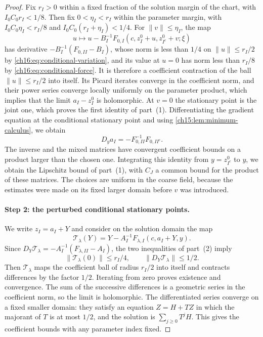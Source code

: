 \begin{proof}
Fix $r_I>0$ within a fixed fraction of the solution margin of the chart, with $I_0C_0r_I<1/8$. Then fix $0<\eta_I<r_I$ within the parameter margin, with $I_0C_0\eta_I<r_I/8$ and $I_0C_0(r_I+\eta_I)<1/4$. For $\|v\|\le\eta_I$, the map
\[
 u\longmapsto u-B_I^{-1}F_{0,I}(c,z_I^0+u,z_{I^c}^0+v;\xi)
\]
has derivative $-B_I^{-1}(F_{0,II}-B_I)$, whose norm is less than $1/4$ on $\|u\|\le r_I/2$ by \eqref{ch16:eq:conditional-variation}, and its value at $u=0$ has norm less than $r_I/8$ by \eqref{ch16:eq:conditional-force}. It is therefore a coefficient contraction of the ball $\|u\|\le r_I/2$ into itself. Its Picard iterates converge in the coefficient norm, and their power series converge locally uniformly on the parameter product, which implies that the limit $a_I-z_I^0$ is holomorphic. At $v=0$ the stationary point is the joint one, which proves the first identity of part~(1). Differentiating the gradient equation at the conditional stationary point and using \cref{ch15:lem:minimum-calculus}, we obtain
\[
 D_ya_I=-F_{0,II}^{-1}F_{0,II^c}.
\]
The inverse and the mixed matrices have convergent coefficient bounds on a product larger than the chosen one. Integrating this identity from $y=z^0_{I^c}$ to $y$, we obtain the Lipschitz bound of part~(1), with $C_J$ a common bound for the product of these matrices. The choices are uniform in the coarse field, because the estimates were made on its fixed larger domain before $v$ was introduced.

\paragraph{Step 2: the perturbed conditional stationary points.}
We write $z_I=a_I+Y$ and consider on the solution domain the map
\begin{equation}\label{ch16:eq:preconditioned-map}
 \mathcal T_\lambda(Y)=Y-A_I^{-1}
                   F_{\lambda,I}(c,a_I+Y,y).
\end{equation}
Since $D_Y\mathcal T_\lambda=-A_I^{-1}(F_{\lambda,II}-A_I)$, the two inequalities of part~(2) imply
\[
 \|\mathcal T_\lambda(0)\|\le r_I/4,\qquad
 \|D_Y\mathcal T_\lambda\|\le1/2.
\]
Then $\mathcal T_\lambda$ maps the coefficient ball of radius $r_I/2$ into itself and contracts differences by the factor $1/2$. Iterating from zero proves existence and convergence. The sum of the successive differences is a geometric series in the coefficient norm, so the limit is holomorphic. The differentiated series converge on a fixed smaller domain: they satisfy an equation $Z=H+TZ$ in which the majorant of $T$ is at most $1/2$, and the solution is $\sum_{j\ge0}T^jH$. This gives the coefficient bounds with any parameter index fixed.


\end{proof}

